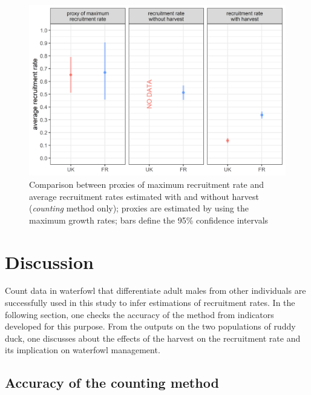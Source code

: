\documentclass[
  english,
]{article}
\begin{document}
\begin{figure}[H]

{\centering \includegraphics[width=1\linewidth]{../Output/plot_7} 

}

\caption{Comparison between proxies of maximum recruitment rate and average recruitment rates estimated with and without harvest (\emph{counting} method only); proxies are estimated by using the maximum growth rates; bars define the 95\% confidence intervals}\label{fig:grcomp}
\end{figure}

\hypertarget{discussion}{%
\section{Discussion}\label{discussion}}

Count data in waterfowl that differentiate adult males from other individuals are successfully used in this study to infer estimations of recruitment rates. In the following section, one checks the accuracy of the method from indicators developed for this purpose. From the outputs on the two populations of ruddy duck, one discusses about the effects of the harvest on the recruitment rate and its implication on waterfowl management.

\hypertarget{accuracy-of-the-counting-method}{%
\subsection{Accuracy of the counting method}\label{accuracy-of-the-counting-method}}
\end{document}
